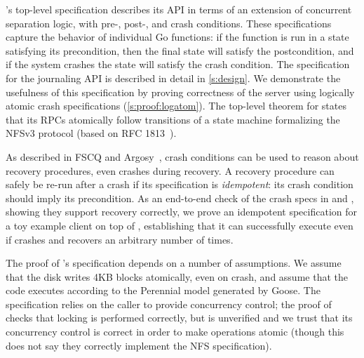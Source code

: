 \txn's top-level specification describes its API in terms of an extension of
concurrent separation logic, with pre-, post-, and crash conditions. These
specifications capture the behavior of individual Go functions: if the function
is run in a state satisfying its precondition, then the final state will satisfy
the postcondition, and if the system crashes the state will satisfy the crash
condition. The specification for the journaling API is described in detail in \autoref{s:design}. We
demonstrate the usefulness of this specification by proving correctness of the \simplenfs
server using logically atomic crash specifications (\autoref{s:proof:logatom}). %
The top-level theorem for \simplenfs states that its RPCs
atomically follow transitions of a state machine formalizing the NFSv3 protocol (based on RFC
1813~\cite{RFC:1813}).

As described in FSCQ and Argosy~\cite{chen:fscq,chajed:argosy}, crash conditions
can be used to reason about recovery procedures, even crashes during recovery. A
recovery procedure can safely be re-run after a crash if its specification is
\emph{idempotent}: its crash condition should imply its precondition. As an
end-to-end check of the crash specs in \simplenfs and \txn, showing they support
recovery correctly, we prove an idempotent specification for a toy example
client on top of \simplenfs, establishing that it can successfully execute even if
\simplenfs crashes and recovers an arbitrary number of times.

The proof of \txn's specification depends on a number of assumptions. We assume
that the disk writes 4KB blocks atomically, even on crash, and assume that the
code executes according to the Perennial model generated by Goose. The
specification relies on the caller to provide concurrency control; the proof of
\simplenfs checks that locking is performed correctly, but \gnfs is unverified
and we trust that its concurrency control is correct in order to make operations
atomic (though this does not say they correctly implement the NFS
specification).

